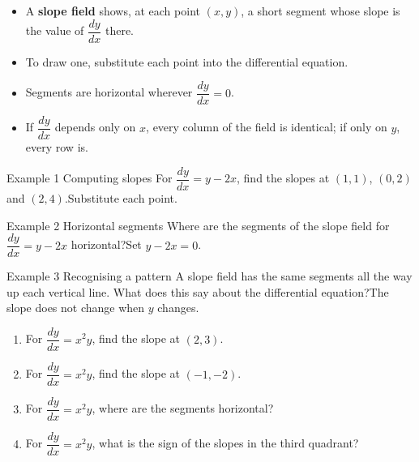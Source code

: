 \documentclass[11pt]{article}
\begin{document}

\begin{ideabox}
\begin{itemize}[leftmargin=*,itemsep=2pt,topsep=2pt]
  \item A \textbf{slope field} shows, at each point $(x,y)$, a short segment whose slope is the value of $\dfrac{dy}{dx}$ there.
  \item To draw one, substitute each point into the differential equation.
  \item Segments are horizontal wherever $\dfrac{dy}{dx}=0$.
  \item If $\dfrac{dy}{dx}$ depends only on $x$, every column of the field is identical; if only on $y$, every row is.
\end{itemize}
\end{ideabox}

\begin{example}{Example 1 \textperiodcentered{} Computing slopes}
For $\dfrac{dy}{dx}=y-2x$, find the slopes at $(1,1)$, $(0,2)$ and $(2,4)$.\soln Substitute each point.
\end{example}

\begin{example}{Example 2 \textperiodcentered{} Horizontal segments}
Where are the segments of the slope field for $\dfrac{dy}{dx}=y-2x$ horizontal?\soln Set $y-2x=0$.
\end{example}

\begin{example}{Example 3 \textperiodcentered{} Recognising a pattern}
A slope field has the same segments all the way up each vertical line. What does this say about the differential equation?\soln The slope does not change when $y$ changes.
\end{example}

\newpage
{}

\begin{enumerate}[leftmargin=*,itemsep=2pt]
  \item For $\dfrac{dy}{dx}=x^2y$, find the slope at $(2,3)$.\work{2.3cm}
  \item For $\dfrac{dy}{dx}=x^2y$, find the slope at $(-1,-2)$.\work{2.3cm}
  \item For $\dfrac{dy}{dx}=x^2y$, where are the segments horizontal?\work{2.3cm}
  \item For $\dfrac{dy}{dx}=x^2y$, what is the sign of the slopes in the third quadrant?\work{2.3cm}
\end{enumerate}
\end{document}
